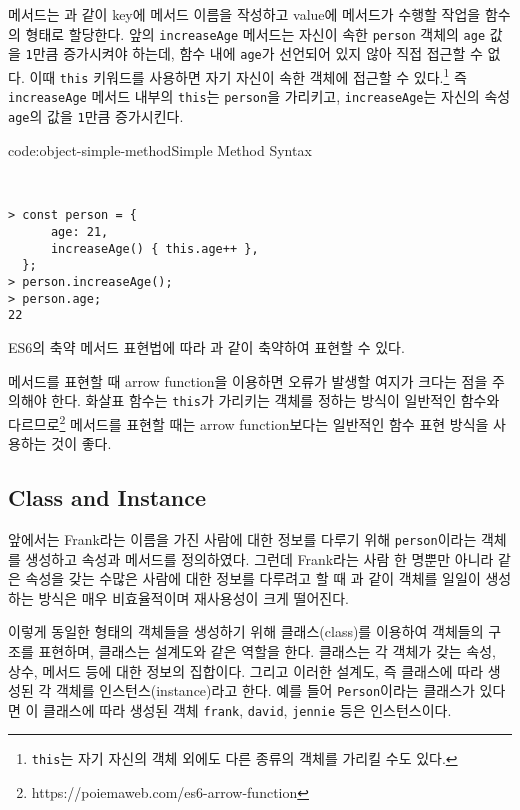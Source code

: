 메서드는 과 같이 key에 메서드 이름을 작성하고 value에 메서드가 수행할 작업을 함수의 형태로 할당한다. 앞의 \texttt{increaseAge} 메서드는 자신이 속한 \texttt{person} 객체의 \texttt{age} 값을 \texttt{1}만큼 증가시켜야 하는데, 함수 내에 \texttt{age}가 선언되어 있지 않아 직접 접근할 수 없다. 이때 \texttt{this} 키워드를 사용하면 자기 자신이 속한 객체에 접근할 수 있다.\footnote{\texttt{this}는 자기 자신의 객체 외에도 다른 종류의 객체를 가리킬 수도 있다.} 즉 \texttt{increaseAge} 메서드 내부의 \texttt{this}는 \texttt{person}을 가리키고, \texttt{increaseAge}는 자신의 속성 \texttt{age}의 값을 \texttt{1}만큼 증가시킨다.

\begin{codeenv}{code:object-simple-method}{Simple Method Syntax}\begin{verbatim}


> const person = {
      age: 21,
      increaseAge() { this.age++ },
  };
> person.increaseAge();
> person.age;
22
\end{verbatim}
\end{codeenv}

ES6의 축약 메서드 표현법에 따라 과 같이 축약하여 표현할 수 있다.

메서드를 표현할 때 arrow function을 이용하면 오류가 발생할 여지가 크다는 점을 주의해야 한다. 화살표 함수는 \texttt{this}가 가리키는 객체를 정하는 방식이 일반적인 함수와 다르므로\footnote{https://poiemaweb.com/es6-arrow-function} 메서드를 표현할 때는 arrow function보다는 일반적인 함수 표현 방식을 사용하는 것이 좋다.

\subsection*{Class and Instance}

앞에서는 Frank라는 이름을 가진 사람에 대한 정보를 다루기 위해 \texttt{person}이라는 객체를 생성하고 속성과 메서드를 정의하였다. 그런데 Frank라는 사람 한 명뿐만 아니라 같은 속성을 갖는 수많은 사람에 대한 정보를 다루려고 할 때 과 같이 객체를 일일이 생성하는 방식은 매우 비효율적이며 재사용성이 크게 떨어진다.

이렇게 동일한 형태의 객체들을 생성하기 위해 클래스(class)를 이용하여 객체들의 구조를 표현하며, 클래스는 설계도와 같은 역할을 한다. 클래스는 각 객체가 갖는 속성, 상수, 메서드 등에 대한 정보의 집합이다. 그리고 이러한 설계도, 즉 클래스에 따라 생성된 각 객체를 인스턴스(instance)라고 한다. 예를 들어 \texttt{Person}이라는 클래스가 있다면 이 클래스에 따라 생성된 객체 \texttt{frank}, \texttt{david}, \texttt{jennie} 등은 인스턴스이다.

